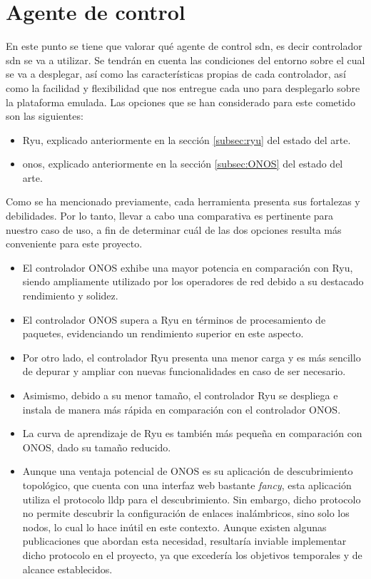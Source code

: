 \section{Agente de control }
\label{sec:ana_controller}

En este punto se tiene que valorar qué agente de control \gls{sdn}, es decir controlador \gls{sdn} se va a utilizar. Se tendrán en cuenta las condiciones del entorno sobre el cual se va a desplegar, así como las características propias de cada controlador, así como la facilidad y flexibilidad que nos entregue cada uno para desplegarlo sobre la plataforma emulada. Las opciones que se han considerado para este cometido son las siguientes:

\begin{itemize}
    \item Ryu, explicado anteriormente en la sección \ref{subsec:ryu} del estado del arte.

    \item \gls{onos}, explicado anteriormente en la sección \ref{subsec:ONOS} del estado del arte.
\end{itemize}

Como se ha mencionado previamente, cada herramienta presenta sus fortalezas y debilidades. Por lo tanto, llevar a cabo una comparativa es pertinente para nuestro caso de uso, a fin de determinar cuál de las dos opciones resulta más conveniente para este proyecto.

\begin{itemize}
    \item El controlador ONOS exhibe una mayor potencia en comparación con Ryu, siendo ampliamente utilizado por los operadores de red debido a su destacado rendimiento y solidez.
    \item El controlador ONOS supera a Ryu en términos de procesamiento de paquetes, evidenciando un rendimiento superior en este aspecto.
    \item Por otro lado, el controlador Ryu presenta una menor carga y es más sencillo de depurar y ampliar con nuevas funcionalidades en caso de ser necesario.
    \item Asimismo, debido a su menor tamaño, el controlador Ryu se despliega e instala de manera más rápida en comparación con el controlador ONOS.
    \item La curva de aprendizaje de Ryu es también más pequeña en comparación con ONOS, dado su tamaño reducido.
    \item Aunque una ventaja potencial de ONOS es su aplicación de descubrimiento topológico, que cuenta con una interfaz web bastante \textit{fancy}, esta aplicación utiliza el protocolo \gls{lldp} para el descubrimiento. Sin embargo, dicho protocolo no permite descubrir la configuración de enlaces inalámbricos, sino solo los nodos, lo cual lo hace inútil en este contexto. Aunque existen algunas publicaciones \cite{martinez2021ehddp} que abordan esta necesidad, resultaría inviable implementar dicho protocolo en el proyecto, ya que excedería los objetivos temporales y de alcance establecidos.
\end{itemize}


